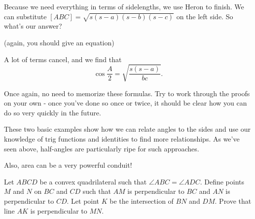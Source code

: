 


Because we need everything in terms of sidelengths, we use Heron to finish. We can substitute $[ABC] = \sqrt{s(s-a)(s-b)(s-c)}$ on the left side. So what's our answer?

(again, you should give an equation)





A lot of terms cancel, and we find that $$\cos\frac{A}{2} = \sqrt{\frac{s(s-a)}{ bc}}.$$

Once again, no need to memorize these formulas.  Try to work through the proofs on your own - once you've done so once or twice, it should be clear how you can do so very quickly in the future.

\begin{remark}
    These two basic examples show how we can relate angles to the sides and use our knowledge of trig functions and identities to find more relationships.  As we've seen above, half-angles are particularly ripe for such approaches.

    Also, area can be a very powerful conduit!
        
\end{remark}

\begin{example}
Let $ABCD$ be a convex quadrilateral such that $\angle ABC = \angle ADC.$ Define points $M$ and $N$ on $BC$ and $CD$ such that $AM$ is perpendicular to $BC$ and $AN$ is perpendicular to $CD.$  Let point $K$ be the intersection of $BN$ and $DM.$  Prove that line $AK$ is perpendicular to $MN.$    
\end{example}

